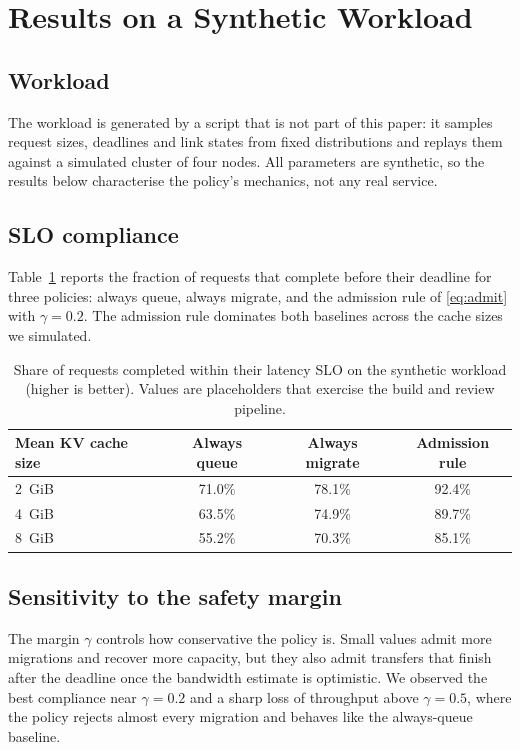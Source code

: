 \section{Results on a Synthetic Workload}
\label{sec:results}

\subsection{Workload}

The workload is generated by a script that is not part of this paper: it samples request sizes, deadlines and link states from fixed distributions and replays them against a simulated cluster of four nodes.
All parameters are synthetic, so the results below characterise the policy's mechanics, not any real service.

\subsection{SLO compliance}

Table~\ref{tab:slo} reports the fraction of requests that complete before their deadline for three policies: always queue, always migrate, and the admission rule of \eqref{eq:admit} with $\gamma = 0.2$.
The admission rule dominates both baselines across the cache sizes we simulated.

\begin{table}[t]
  \centering
  \caption{Share of requests completed within their latency SLO on the synthetic workload (higher is better).
           Values are placeholders that exercise the build and review pipeline.}
  \label{tab:slo}
  \begin{tabular}{lccc}
    \toprule
    Mean KV cache size & Always queue & Always migrate & Admission rule \\
    \midrule
    2~GiB  & 71.0\% & 78.1\% & 92.4\% \\
    4~GiB  & 63.5\% & 74.9\% & 89.7\% \\
    8~GiB  & 55.2\% & 70.3\% & 85.1\% \\
    \bottomrule
  \end{tabular}
\end{table}

\subsection{Sensitivity to the safety margin}

The margin $\gamma$ controls how conservative the policy is.
Small values admit more migrations and recover more capacity, but they also admit transfers that finish after the deadline once the bandwidth estimate is optimistic.
We observed the best compliance near $\gamma = 0.2$ and a sharp loss of throughput above $\gamma = 0.5$, where the policy rejects almost every migration and behaves like the always-queue baseline.

